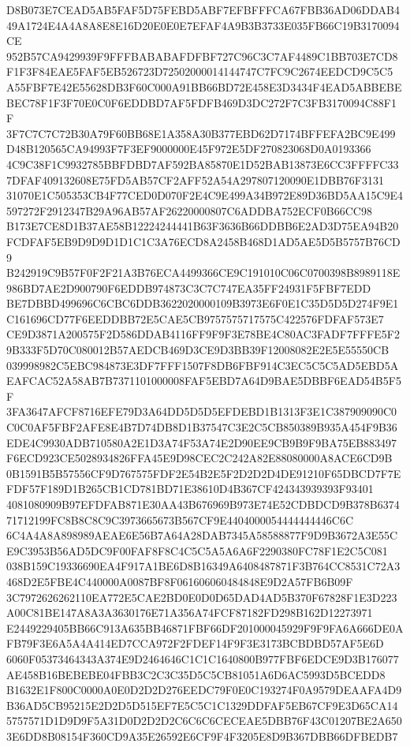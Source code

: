 \documentclass[UTF8,fontset=fandol,zihao=-4,a4paper]{ctexart}
\begin{document}
{{D8B073E7CEAD5AB5FAF5D75FEBD5ABF7EFBFFFCA67FBB36AD06DDAB449A1724E4A4A8A8E8E16D20E0E0E7EFAF4A9B3B3733E035FB66C19B3170094CE
952B57CA9429939F9FFFBABABAFDFBF727C96C3C7AF4489C1BB703E7CD8F1F3F84EAE5FAF5EB526723D72502000014144747C7FC9C2674EEDCD9C5C5
A55FBF7E42E55628DB3F60C000A91BB66BD72E458E3D3434F4EAD5ABBEBEBEC78F1F3F70E0C0F6EDDBD7AF5FDFB469D3DC272F7C3FB3170094C88F1F
3F7C7C7C72B30A79F60BB68E1A358A30B377EBD62D7174BFFEFA2BC9E499D48B120565CA94993F7F3EF9000000E45F972E5DF270823068D0A0193366
4C9C38F1C9932785BBFDBD7AF592BA85870E1D52BAB13873E6CC3FFFFC337DFAF409132608E75FD5AB57CF2AFF52A54A297807120090E1DBB76F3131
31070E1C505353CB4F77CED0D070F2E4C9E499A34B972E89D36BD5AA15C9E4597272F2912347B29A96AB57AF26220000807C6ADDBA752ECF0B66CC98
B173E7CE8D1B37AE58B12224244441B63F3636B66DDBB6E2AD3D75EA94B20FCDFAF5EB9D9D9D1D1C1C3A76ECD8A2458B468D1AD5AE5D5B5757B76CD9
B242919C9B57F0F2F21A3B76ECA4499366CE9C191010C06C0700398B8989118E986BD7AE2D900790F6EDDB974873C3C7C747EA35FF24931F5FBF7EDD
BE7DBBD499696C6CBC6DDB3622020000109B3973E6F0E1C35D5D5D274F9E1C161696CD77F6EEDDBB72E5CAE5CB9757575717575C422576FDFAF573E7
CE9D3871A200575F2D586DDAB4116FF9F9F3E78BE4C80AC3FADF7FFFE5F29B333F5D70C080012B57AEDCB469D3CE9D3BB39F12008082E2E5E55550CB
039998982C5EBC984873E3DF7FFF1507F8DB6FBF914C3EC5C5C5AD5EBD5AEAFCAC52A58AB7B7371101000008FAF5EBD7A64D9BAE5DBBF6EAD54B5F5F
3FA3647AFCF8716EFE79D3A64DD5D5D5EFDEBD1B1313F3E1C387909090C0C0C0AF5FBF2AFE8E4B7D74DB8D1B37547C3E2C5CB850389B935A454F9B36
EDE4C9930ADB710580A2E1D3A74F53A74E2D90EE9CB9B9F9BA75EB883497F6ECD923CE5028934826FFA45E9D98CEC2C242A82E88080000A8ACE6CD9B
0B1591B5B57556CF9D767575FDF2E54B2E5F2D2D2D4DE91210F65DBCD7F7EFDF57F189D1B265CB1CD781BD71E38610D4B367CF424343939393F93401
4081080909B97EFDFAB871E30AA43B676969B973E74E52CDBDCD9B378B637471712199FC8B8C8C9C3973665673B567CF9E4404000054444444446C6C
6C4A4A8A898989AEAE6E56B7A64A28DAB7345A58588877F9D9B3672A3E55CE9C3953B56AD5DC9F00FAF8F8C4C5C5A5A6A6F2290380FC78F1E2C5C081
038B159C19336690EA4F917A1BE6D8B16349A6408487871F3B764CC8531C72A3468D2E5FBE4C440000A0087BF8F061606060484848E9D2A57FB6B09F
3C7972626262110EA772E5CAE2BD0E0D0D65DAD4AD5B370F67828F1E3D223A00C81BE147A8A3A3630176E71A356A74FCF87182FD298B162D12273971
E2449229405BB66C913A635BB46871FBF66DF201000045929F9F9FA6A666DE0AFB79F3E6A5A4A414ED7CCA972F2FDEF14F9F3E3173BCBDBD57AF5E6D
6060F05373464343A374E9D2464646C1C1C1640800B977FBF6EDCE9D3B176077AE458B16BEBEBE04FBB3C2C3C35D5C5CB81051A6D6AC5993D5BCEDD8
B1632E1F800C0000A0E0D2D2D276EEDC79F0E0C193274F0A9579DEAAFA4D9B36AD5CB95215E2D2D5D515EF7E5C5C1C1329DDFAF5EB67CF9E3D65CA14
5757571D1D9D9F5A31D0D2D2D2C6C6C6CECEAE5DBB76F43C01207BE2A6503E6DD8B08154F360CD9A35E26592E6CF9F4F3205E8D9B367DBB66DFBEDB7
}}
\end{document}
